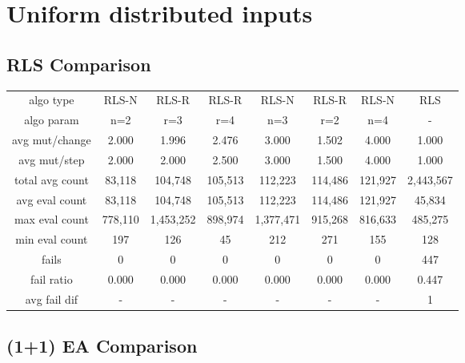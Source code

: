 
\section{Uniform distributed inputs}

\subsection{RLS Comparison}


\begin{tabular}[h]{cccccccc}
algo type&            RLS-N&     RLS-R&     RLS-R&     RLS-N&     RLS-R&     RLS-N&       RLS\\
algo param&             n=2&       r=3&       r=4&       n=3&       r=2&       n=4&         -\\
avg mut/change&       2.000&     1.996&     2.476&     3.000&     1.502&     4.000&     1.000\\
avg mut/step&         2.000&     2.000&     2.500&     3.000&     1.500&     4.000&     1.000\\
\hline
total avg count&     83,118&   104,748&   105,513&   112,223&   114,486&   121,927& 2,443,567\\
avg eval count&      83,118&   104,748&   105,513&   112,223&   114,486&   121,927&    45,834\\
max eval count&     778,110& 1,453,252&   898,974& 1,377,471&   915,268&   816,633&   485,275\\
min eval count&         197&       126&        45&       212&       271&       155&       128\\
\hline
fails&                    0&         0&         0&         0&         0&         0&       447\\
fail ratio&           0.000&     0.000&     0.000&     0.000&     0.000&     0.000&     0.447\\
avg fail dif&             -&         -&         -&         -&         -&         -&         1\\
\end{tabular}


\subsection{(1+1) EA Comparison}


